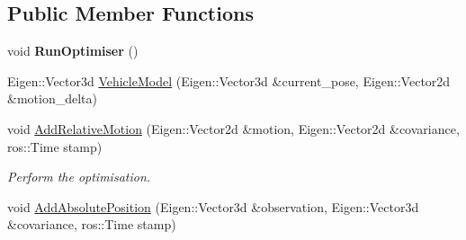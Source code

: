 \subsection*{Public Member Functions}
\begin{DoxyCompactItemize}
\item 
\mbox{\label{classGraphOptimiser_a986c07622d992bcf4ea4b6711a025b5e}} 
void {\bfseries Run\+Optimiser} ()
\item 
Eigen\+::\+Vector3d \hyperlink{classGraphOptimiser_a3310a9869b3cec56fb9ccc6a0c944e15}{Vehicle\+Model} (Eigen\+::\+Vector3d \&current\+\_\+pose, Eigen\+::\+Vector2d \&motion\+\_\+delta)
\item 
void \hyperlink{classGraphOptimiser_ad856bbb20088fae667b00f8ef0355f32}{Add\+Relative\+Motion} (Eigen\+::\+Vector2d \&motion, Eigen\+::\+Vector2d \&covariance, ros\+::\+Time stamp)
\begin{DoxyCompactList}\small\item\em Perform the optimisation. \end{DoxyCompactList}\item 
void \hyperlink{classGraphOptimiser_addfbfde9e277dd61876e64fd23c7eae8}{Add\+Absolute\+Position} (Eigen\+::\+Vector3d \&observation, Eigen\+::\+Vector3d \&covariance, ros\+::\+Time stamp)
\end{DoxyCompactItemize}
